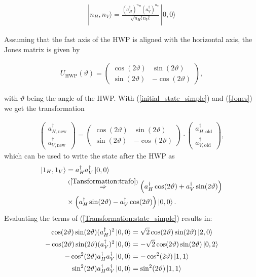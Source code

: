 \documentclass[%
 reprint,
 amsmath,amssymb,
 aps,
twocolumn
]{revtex4-2}
\begin{document}
\begin{align}
\label{Fock}
|n_H, n_V\rangle = \frac{(a_H^\dagger)^{n_H}(a_V^\dagger)^{n_V}}{\sqrt{n_H! \, n_V!}} \, |0,0\rangle
\end{align}

Assuming that the fast axis of the HWP is aligned with the horizontal axis, the Jones matrix is given by\cite{collett2005fieldguidepolarization}

\begin{align}
\label{Jones}
    U_{\text{HWP}}(\vartheta) = 
    \begin{pmatrix}
    \cos(2\vartheta) & \sin(2\vartheta) \\
    \sin(2\vartheta) & -\cos(2\vartheta) 
    \end{pmatrix},
\end{align}

with $\vartheta$ being the angle of the HWP. With (\ref{initial_state_simple}) and (\ref{Jones}) we get the transformation

\begin{align}
\label{Tansformation:trafo}
    \begin{pmatrix}
    a_{H,\text{new}}^\dagger  \\
    a_{V,\text{new}}^\dagger
    \end{pmatrix}
    =
    \begin{pmatrix}
    \cos(2\vartheta) & \sin(2\vartheta) \\
    \sin(2\vartheta) & -\cos(2\vartheta) 
    \end{pmatrix}
    \cdot
    \begin{pmatrix}
    a_{H,\text{old}}^\dagger  \\
    a_{V,\text{old}}^\dagger
    \end{pmatrix},
\end{align}
which can be used to write the state after the HWP as
\begin{align}
\label{Transformation:state_simple}
    \ket{1_H,1_V}&=a_H^\dagger a_V^\dagger\ket{0,0}\notag\\
    &\overset{(\ref{Tansformation:trafo})}{\Rightarrow} \left(a_H^\dagger\cos(2\vartheta)+a_V^\dagger\sin(2\vartheta)\right)\notag\\
    &\times\left(a_H^\dagger\sin(2\vartheta)-a_V^\dagger\cos(2\vartheta)\right)\ket{0,0}.
\end{align}
Evaluating the terms of (\ref{Transformation:state_simple}) results in:
\begin{align}
    \cos(2\vartheta)\sin(2\vartheta)(a_H^\dagger)^2\ket{0,0} &= \sqrt{2}\cos(2\vartheta)\sin(2\vartheta)\ket{2,0} \label{Transformation:terms_simple1}\\
    -\cos(2\vartheta)\sin(2\vartheta)(a_V^\dagger)^2\ket{0,0} &= -\sqrt{2}\cos(2\vartheta)\sin(2\vartheta)\ket{0,2} \label{Transformation:terms_simple2}\\
    -\cos^2(2\vartheta)a_H^\dagger a_V^\dagger\ket{0,0} &= -\cos^2(2\vartheta)\ket{1,1} \label{Transformation:terms_simple3}\\
    \sin^2(2\vartheta)a_H^\dagger a_V^\dagger\ket{0,0} &= \sin^2(2\vartheta)\ket{1,1}\label{Transformation:terms_simple4}
\end{align}
\end{document}
